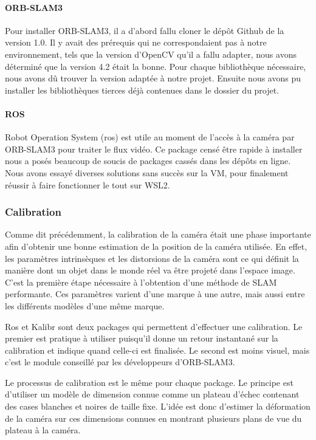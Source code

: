 \documentclass[11pt]{article}
\begin{document}
        \paragraph{ORB-SLAM3}
          Pour installer ORB-SLAM3, il a d'abord fallu cloner le dépôt Github de la version 1.0. 
          Il y avait des prérequis qui ne correspondaient pas à notre environnement, tels que la version d'OpenCV qu'il a fallu adapter,
          nous avons déterminé que la version 4.2 était la bonne. Pour chaque bibliothèque nécessaire, nous avons dû trouver la version
          adaptée à notre projet. Ensuite nous avons pu installer les bibliothèques tierces déjà contenues dans le dossier du projet.        

        \paragraph{ROS}
          Robot Operation System (\acrshort{ros}) est utile au moment de l'accès à la caméra par ORB-SLAM3 pour traiter le flux vidéo.
          Ce package censé être rapide à installer nous a posés beaucoup de soucis de packages cassés dans les dépôts en ligne. Nous avons 
          essayé diverses solutions sans succès sur la VM, pour finalement réussir à faire fonctionner le tout sur WSL2. 

      \subsubsection{Calibration}
        Comme dit précédemment, la calibration de la caméra était une phase importante afin d'obtenir une bonne estimation de la position
        de la caméra utilisée. En effet, les paramètres intrinsèques et les distorsions de la caméra sont ce qui définit la manière dont 
        un objet dans le monde réel va être projeté dans l'espace image. C'est la première étape nécessaire à l'obtention d'une méthode de 
        SLAM performante. Ces paramètres varient d'une marque à une autre, mais aussi entre les différents modèles d'une même marque.

        Ros et Kalibr sont deux packages qui permettent d'effectuer une calibration. Le premier est pratique à utiliser puisqu'il donne un 
        retour instantané sur la calibration et indique quand celle-ci est finalisée. Le second est moins visuel, mais c'est le module 
        conseillé par les développeurs d'ORB-SLAM3.

        Le processus de calibration est le même pour chaque package. Le principe est d'utiliser un modèle de dimension connue comme
        un plateau d'échec contenant des cases blanches et noires de taille fixe. L'idée est donc d'estimer la déformation de la caméra
        sur ces dimensions connues en montrant plusieurs plans de vue du plateau à la caméra.           
\end{document}
